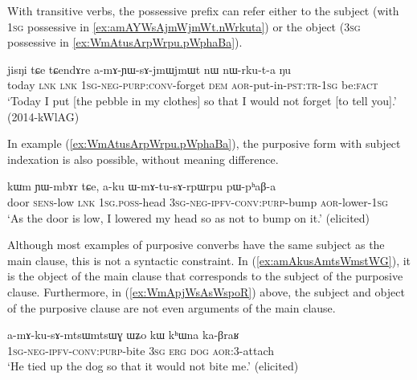 With transitive verbs, the possessive prefix can refer either to the subject (with \textsc{1sg} possessive  in \ref{ex:amAYWsAjmWjmWt.nWrkuta}) or the object (\textsc{3sg} possessive  in \ref{ex:WmAtusArpWrpu.pWphaBa}).

\begin{exe}
\ex \label{ex:amAYWsAjmWjmWt.nWrkuta}
\gll jisŋi tɕe tɕendɤre a-mɤ-ɲɯ-sɤ-jmɯ\redp{}jmɯt nɯ nɯ-rku-t-a ŋu \\
today \textsc{lnk} \textsc{lnk} \textsc{1sg}-\textsc{neg}-\textsc{purp}:\textsc{conv}-forget \textsc{dem} \textsc{aor}-put-in-\textsc{pst}:\textsc{tr}-\textsc{1sg} be:\textsc{fact} \\
\glt `Today I put [the pebble in my clothes] so that I would not forget [to tell you].' (2014-kWlAG)
\end{exe}

In example (\ref{ex:WmAtusArpWrpu.pWphaBa}), the purposive form  with subject indexation is also possible, without meaning difference.

\begin{exe}
\ex \label{ex:WmAtusArpWrpu.pWphaBa}
\gll kɯm ɲɯ-mbɤr tɕe, a-ku ɯ-mɤ-tu-sɤ-rpɯ\redp{}rpu pɯ-pʰaβ-a \\
door \textsc{sens}-low \textsc{lnk} \textsc{1sg}.\textsc{poss}-head \textsc{3sg}-\textsc{neg}-\textsc{ipfv}-\textsc{conv}:\textsc{purp}-bump \textsc{aor}-lower-\textsc{1sg}\\
\glt `As the door is low, I lowered my head so as not to bump on it.' (elicited)
\end{exe}

Although most examples of purposive converbs have the same subject as the main clause, this is not a syntactic constraint. In (\ref{ex:amAkusAmtsWmstWG}), it is the object of the main clause  that corresponds to the subject of the purposive clause. Furthermore, in (\ref{ex:WmApjWsAsWspoR}) above, the subject and object of the purposive clause are not even arguments of the main clause.

\begin{exe}
\ex \label{ex:amAkusAmtsWmstWG}
\gll  a-mɤ-ku-sɤ-mtsɯ\redp{}mtsɯɣ ɯʑo kɯ kʰɯna ka-βraʁ \\
\textsc{1sg}-\textsc{neg}-\textsc{ipfv}-\textsc{conv}:\textsc{purp}-bite \textsc{3sg} \textsc{erg} \textsc{dog} \textsc{aor}:3\flobv{}-attach \\
\glt `He tied up the dog so that it would not bite me.' (elicited)
\end{exe}

